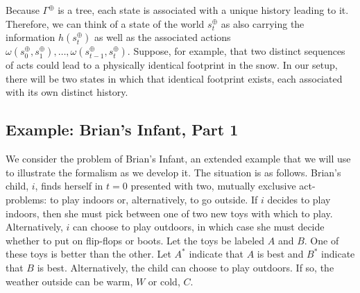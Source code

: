 \documentclass[
11pt,
titlepage,
reqno,
]{article}%
\theoremstyle{definition}
\begin{document}
Because $\Gamma^\oplus$ is a tree, each state is associated with a unique history leading to it. 
Therefore, we can think of a state of the world  $s^\oplus_t$ as also carrying the information $h(s^\oplus_t)$ as well as the associated actions $\omega(s^\oplus_0,s^\oplus_1),\ldots,\omega(s^\oplus_{t-1},s^\oplus_t)$. 
Suppose, for example, that two distinct sequences of acts could lead to a physically identical footprint in the snow.	
In our setup, there will be two states in which that identical footprint exists, each associated with its own distinct history.



\subsection{Example: Brian's Infant, Part 1}	
We consider the problem of Brian's Infant, an extended example that we will use  to illustrate the formalism as we develop it.
The situation is as follows.
Brian's child, $i$, finds herself in $t=0$ presented with two, mutually exclusive act-problems: to play indoors or, alternatively, to go outside. 
If $i$ decides to play indoors, then she must pick between one of two new toys with which to play.
Alternatively, $i$ can choose to play outdoors, in which case she must decide whether to put on flip-flops or boots.
Let the toys be labeled $A$ and $B$. 
One of these toys is better than the other. 
Let $A^\ast$ indicate that $A$ is best and $B^\ast$ indicate that $B$ is best. 
Alternatively, the child can choose to play outdoors.
If so,  the weather outside can be warm, $W$ or cold, $C$.
 
\end{document}
